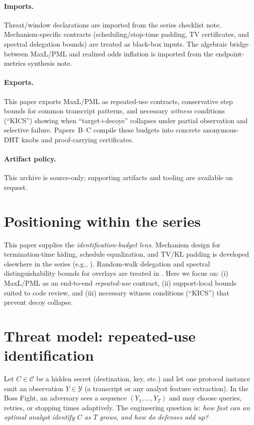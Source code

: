 \documentclass[11pt]{article}
\newcommand{\C}{\mathcal{C}} %
\newcommand{\Y}{\mathcal{Y}} %
\begin{document}
\paragraph{Imports.}
Threat/window declarations are imported from the series checklist note.\cite{series:threatwindows}
Mechanism-specific contracts (scheduling/stop-time padding, TV certificates, and spectral delegation bounds) are treated as black-box inputs.\cite{series:schedcompiler,series:knapsacktransport,series:prefixcapacities,series:manytestinglowerbounds,series:stoptimeaddendum,series:spectral}
The algebraic bridge between MaxL/PML and realized odds inflation is imported from the endpoint-metrics synthesis note.\cite{series:endpointbridge}

\paragraph{Exports.}
This paper exports MaxL/PML as repeated-use contracts, conservative step bounds for common transcript patterns, and necessary \emph{witness} conditions (``KICS'') showing when ``target+decoys'' collapses under partial observation and selective failure.
Papers~B--C compile these budgets into concrete anonymous-DHT knobs and proof-carrying certificates.

\paragraph{Artifact policy.}
This archive is source-only; supporting artifacts and tooling are available on request.\cite{series:artifactpolicy}


\section{Positioning within the series}\label{sec:series}
This paper supplies the \emph{identification-budget lens}.
Mechanism design for termination-time hiding, schedule equalization, and TV/KL padding is developed elsewhere in the series
(e.g., \cite{series:schedcompiler,series:knapsacktransport,series:prefixcapacities,series:manytestinglowerbounds,series:stoptimeaddendum}).
Random-walk delegation and spectral distinguishability bounds for overlays are treated in \cite{series:spectral}.
Here we focus on:
(i) MaxL/PML as an end-to-end \emph{repeated-use} contract,
(ii) support-local bounds suited to code review, and
(iii) necessary witness conditions (``KICS'') that prevent decoy collapse.

\section{Threat model: repeated-use identification}\label{sec:bossfight}
Let $C\in\C$ be a hidden secret (destination, key, etc.) and let one protocol instance emit an observation $Y\in\Y$ (a transcript or any analyst feature extraction).
In the Boss Fight, an adversary sees a sequence $(Y_1,\dots,Y_T)$ and may choose queries, retries, or stopping times adaptively.
The engineering question is: \emph{how fast can an optimal analyst identify $C$ as $T$ grows, and how do defenses add up?}
\end{document}
